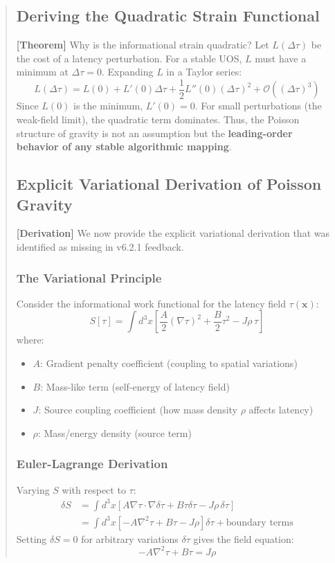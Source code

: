 \documentclass[11pt,titlepage]{article}
\newcommand{\tagtheo}{\textcolor{green!60!black}{\textbf{[Theorem]}} }
\newcommand{\tagderiv}{\textcolor{orange!70!black}{\textbf{[Derivation]}} }
\begin{document}
\begin{abstract}
\subsection{Deriving the Quadratic Strain Functional}
\tagtheo Why is the informational strain quadratic? Let $L(\Delta \tau)$ be the cost of a latency perturbation. For a stable UOS, $L$ must have a minimum at $\Delta \tau = 0$. Expanding $L$ in a Taylor series:
\begin{equation}
L(\Delta \tau) = L(0) + L'(0)\Delta \tau + \frac{1}{2}L''(0)(\Delta \tau)^2 + \mathcal{O}((\Delta \tau)^3)
\end{equation}
Since $L(0)$ is the minimum, $L'(0)=0$. For small perturbations (the weak-field limit), the quadratic term dominates. Thus, the Poisson structure of gravity is not an assumption but the \textbf{leading-order behavior of any stable algorithmic mapping}.


\subsection{Explicit Variational Derivation of Poisson Gravity}
\tagderiv We now provide the explicit variational derivation that was identified as missing in v6.2.1 feedback.

\subsubsection{The Variational Principle}
Consider the informational work functional for the latency field $\tau(\mathbf{x})$:
\begin{equation}
S[\tau] = \int d^3x \left[ \frac{A}{2} (\nabla\tau)^2 + \frac{B}{2} \tau^2 - J\rho\,\tau \right]
\end{equation}
where:
\begin{itemize}
    \item $A$: Gradient penalty coefficient (coupling to spatial variations)
    \item $B$: Mass-like term (self-energy of latency field) 
    \item $J$: Source coupling coefficient (how mass density $\rho$ affects latency)
    \item $\rho$: Mass/energy density (source term)
\end{itemize}

\subsubsection{Euler-Lagrange Derivation}
Varying $S$ with respect to $\tau$:
\begin{align}
\delta S &= \int d^3x \left[ A\nabla\tau \cdot \nabla\delta\tau + B\tau\delta\tau - J\rho\,\delta\tau \right] \\
&= \int d^3x \left[ -A\nabla^2\tau + B\tau - J\rho \right] \delta\tau + \text{boundary terms}
\end{align}
Setting $\delta S = 0$ for arbitrary variations $\delta\tau$ gives the field equation:
\begin{equation}
-A\nabla^2\tau + B\tau = J\rho
\end{equation}


\end{abstract}
\end{document}
